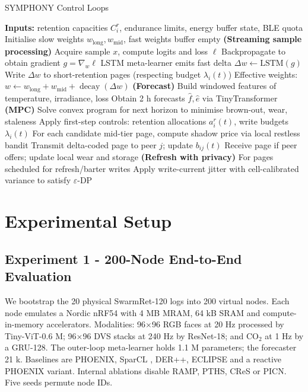 \documentclass{article}
\begin{document}
\begin{algorithm}[H]
\caption{SYMPHONY Control Loops}
\begin{algorithmic}[1]
\State \textbf{Inputs:} retention capacities \(C_{i}^{r}\), endurance limits, energy buffer state, BLE quota
\State Initialise slow weights \(w_{\mathrm{long}}, w_{\mathrm{mid}}\), fast weights buffer empty
  \State \textbf{(Streaming sample processing)}
  \State Acquire sample \(x\), compute logits and loss \(\ell\)
  \State Backpropagate to obtain gradient \(g = \nabla_{w} \ell\)
  \State LSTM meta-learner emits fast delta \(\Delta w \leftarrow \mathrm{LSTM}(g)\)
  \State Write \(\Delta w\) to short-retention pages (respecting budget \(\lambda_{i}(t)\))
  \State Effective weights: \(w \leftarrow w_{\mathrm{long}} + w_{\mathrm{mid}} + \operatorname{decay}(\Delta w)\)
     \State \textbf{(Forecast)} Build windowed features of temperature, irradiance, loss
     \State Obtain 2 h forecasts \(\hat{f}, \hat{e}\) via TinyTransformer
     \State \textbf{(MPC)} Solve convex program for next horizon to minimise brown-out, wear, staleness
     \State Apply first-step controls: retention allocations \(a_{i}^{r}(t)\), write budgets \(\lambda_{i}(t)\)
  \EndIf
     \State For each candidate mid-tier page, compute shadow price via local restless bandit
        \State Transmit delta-coded page to peer \(j\); update \(b_{ij}(t)\)
        \State Receive page if peer offers; update local wear and storage
     \EndIf
  \EndIf
  \State \textbf{(Refresh with privacy)} For pages scheduled for refresh/barter writes
  \State \quad Apply write-current jitter with cell-calibrated variance to satisfy \(\varepsilon\)-DP
\EndWhile
\end{algorithmic}
\end{algorithm}

\section{Experimental Setup}
\subsection{Experiment 1 - 200-Node End-to-End Evaluation}
We bootstrap the 20 physical SwarmRet-120 logs into 200 virtual nodes. Each node emulates a Nordic nRF54 with 4 MB MRAM, 64 kB SRAM and compute-in-memory accelerators. Modalities: 96$\times$96 RGB faces at 20 Hz processed by Tiny-ViT-0.6 M; 96$\times$96 DVS stacks at 240 Hz by ResNet-18; and CO$_2$ at 1 Hz by a GRU-128. The outer-loop meta-learner holds 1.1 M parameters; the forecaster 21 k. Baselines are PHOENIX, SparCL \cite{wang-2022-sparcl}, DER++, ECLIPSE and a reactive PHOENIX variant. Internal ablations disable RAMP, PTHS, CReS or PICN. Five seeds permute node IDs.
\end{document}
